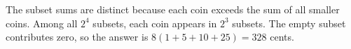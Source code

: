 The subset sums are distinct because each coin exceeds the sum of all smaller coins. Among all $2^4$ subsets, each coin appears in $2^3$ subsets. The empty subset contributes zero, so the answer is $8(1+5+10+25)=\boxed{328}$ cents.
